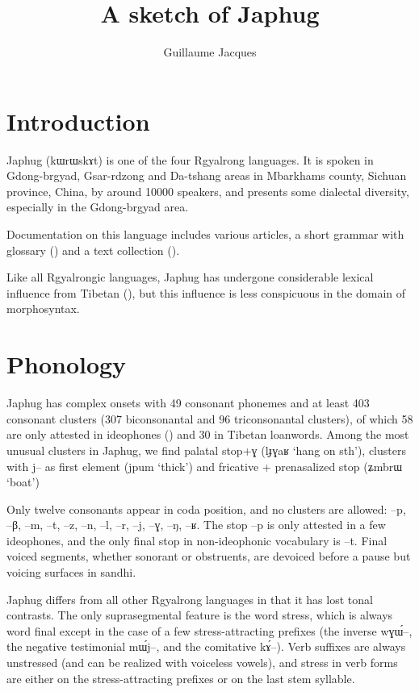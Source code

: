 \documentclass[oldfontcommands,oneside,a4paper,11pt]{article}
\newcommand{\ipa}[1]{{\phon #1}} %
\begin{document}
 

\title{A sketch of Japhug}
\author{Guillaume Jacques}
\maketitle

\section{Introduction}
Japhug (\ipa{kɯrɯskɤt}) is one of the four Rgyalrong languages. It is spoken in Gdong-brgyad, Gsar-rdzong and Da-tshang areas in Mbarkhams county, Sichuan province, China, by around 10000 speakers, and presents some dialectal diversity, especially in the Gdong-brgyad area.

Documentation on this language includes various articles, a short grammar with glossary (\citealt{jacques08}) and a text collection (\citealt{jacques10gesar}).

Like all Rgyalrongic languages, Japhug has undergone considerable lexical influence from Tibetan (\citealt{jacques04these}), but this influence is less conspicuous in the domain of morphosyntax.



\section{Phonology}
Japhug has complex onsets with 49 consonant phonemes and at least 403 consonant clusters (307 biconsonantal and 96 triconsonantal clusters), of which 58 are only attested in ideophones (\citealt{japhug14ideophones}) and 30 in Tibetan loanwords. Among the most unusual clusters in Japhug, we find palatal stop+\ipa{ɣ} (\ipa{lɟɣaʁ} `hang on sth'), clusters with \ipa{j--} as first element (\ipa{jpum} `thick') and fricative + prenasalized stop (\ipa{ʑmbrɯ} `boat')


Only twelve   consonants appear in coda position, and no clusters are allowed:  \ipa{--p}, \ipa{--β}, \ipa{--m}, \ipa{--t}, \ipa{--z}, \ipa{--n}, \ipa{--l}, \ipa{--r}, \ipa{--j}, \ipa{--ɣ}, \ipa{--ŋ}, \ipa{--ʁ}. The stop \ipa{--p} is only attested in a few ideophones, and the only final stop in non-ideophonic vocabulary is \ipa{--t}. Final voiced segments, whether sonorant or obstruents, are devoiced before a pause but voicing surfaces in sandhi.

Japhug differs from all other Rgyalrong languages in that it has lost tonal contrasts. The only suprasegmental feature is the word stress, which is always word final except in the case of a few stress-attracting prefixes (the inverse \ipa{wɣɯ́--}, the negative testimonial \ipa{mɯ́j--}, and the comitative \ipa{kɤ́--}). Verb suffixes are always unstressed (and can be realized with voiceless vowels), and stress in verb forms are either on the stress-attracting prefixes or on the last stem syllable.
\end{document}
